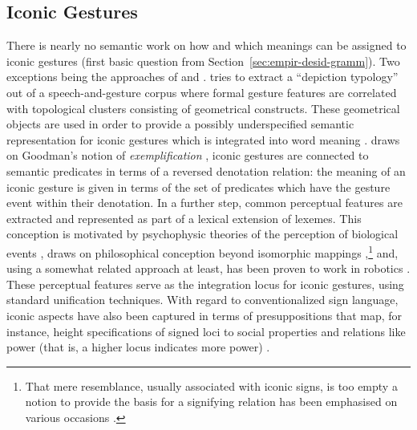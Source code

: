 \documentclass[output=paper]{langsci/langscibook}
\begin{document}
 



\subsection{Iconic Gestures}
\label{sec:iconic-gestures}

 
There is nearly no semantic work on how and which meanings can be assigned to iconic gestures (first basic question from Section~\ref{sec:empir-desid-gramm}).
%
Two exceptions being the approaches of \citet{Rieser:2010} and \citet{Luecking:2013:a,Luecking:2016}.
%
\citet{Rieser:2010} tries to extract a \enquote{depiction typology} out of a speech-and-gesture corpus where formal gesture features are correlated with topological clusters consisting of geometrical constructs. 
%
These geometrical objects are used in order to provide a possibly underspecified semantic representation for iconic gestures which is integrated into word meaning \citep{Hahn:Rieser:2010,Rieser:2011}.
%
\citet{Luecking:2013:a,Luecking:2016} draws on Goodman's notion of \emph{exemplification} \citep{Goodman:1976}, iconic gestures are connected to semantic predicates in terms of a reversed denotation relation: the meaning of an iconic gesture is given in terms of the set of predicates which have the gesture event within their denotation. 
%
In a further step, common perceptual features are extracted and represented as part of a lexical extension of lexemes. 
%
This conception is motivated by psychophysic theories of the perception of biological events \citep{Johansson:1973}, draws on philosophical  conception beyond isomorphic mappings \citep{Peacocke:1987},\footnote{\label{fn:resemblance}That mere resemblance, usually associated with iconic signs, is too empty a notion to provide the basis for a signifying relation has been emphasised on various occasions \citep{Burks:1949,Bierman:1962,Eco:1976,Goodman:1976,Sonesson:1998}.} and, using a somewhat related approach at least, has been proven to work in robotics \citep{Sowa:2006:a}.
%
These perceptual features serve as the integration locus for iconic gestures, using standard unification techniques. 
%
With regard to conventionalized sign language, iconic aspects have also been captured in terms of presuppositions that map, for instance, height specifications of signed loci to social properties and relations like power (that is, a higher locus indicates more power) \citep{Schlenker:Lamberton:Santoro:2013}.
\end{document}
